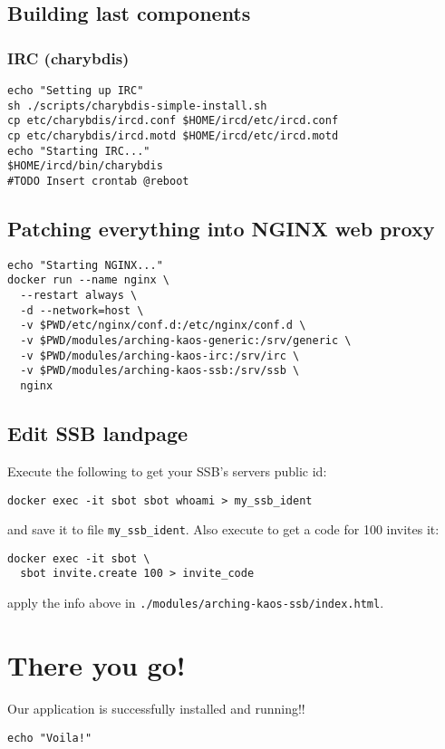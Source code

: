 \documentclass[12pt]{report}
\begin{document}
\subsection{Building last
components}\label{building-last-components}


\subsubsection{IRC (charybdis)}\label{irc-charybdis}

\begin{verbatim}
echo "Setting up IRC"
sh ./scripts/charybdis-simple-install.sh
cp etc/charybdis/ircd.conf $HOME/ircd/etc/ircd.conf
cp etc/charybdis/ircd.motd $HOME/ircd/etc/ircd.motd
echo "Starting IRC..."
$HOME/ircd/bin/charybdis
#TODO Insert crontab @reboot
\end{verbatim}


\subsection{Patching everything into NGINX web
proxy}\label{patching-everything-into-nginx-web-proxy}

\begin{verbatim}
echo "Starting NGINX..."
docker run --name nginx \
  --restart always \
  -d --network=host \
  -v $PWD/etc/nginx/conf.d:/etc/nginx/conf.d \
  -v $PWD/modules/arching-kaos-generic:/srv/generic \
  -v $PWD/modules/arching-kaos-irc:/srv/irc \
  -v $PWD/modules/arching-kaos-ssb:/srv/ssb \
  nginx
\end{verbatim}


\subsection{Edit SSB landpage}\label{edit-ssb-landpage}

Execute the following to get your SSB's servers public id:
\begin{verbatim}
docker exec -it sbot sbot whoami > my_ssb_ident
\end{verbatim}

and save it to file \texttt{my\_ssb\_ident}. Also execute to get a code
for 100 invites it:
\begin{verbatim}
docker exec -it sbot \
  sbot invite.create 100 > invite_code
\end{verbatim}
apply the info above in \texttt{./modules/arching-kaos-ssb/index.html}.


\section{There you go!}\label{there-you-go}

Our application is successfully installed and running!!

\begin{verbatim}
echo "Voila!"
\end{verbatim}
\medskip
\printbibliography[heading=bibintoc,title={Whole bibliography}]
\end{document}
